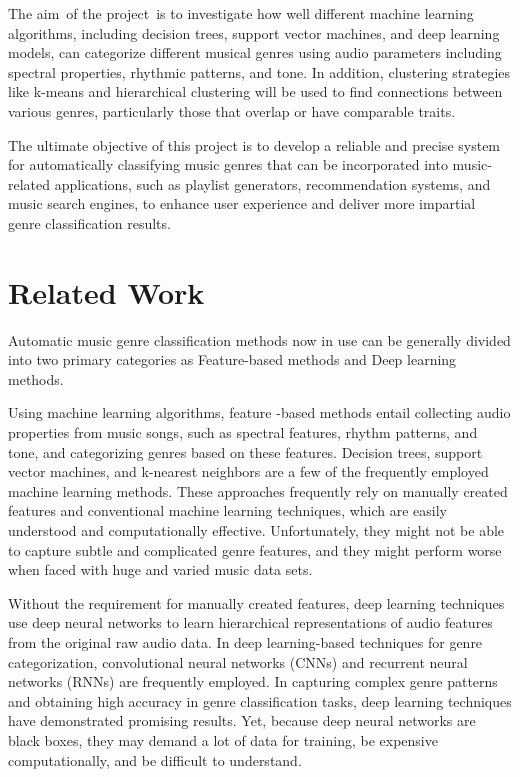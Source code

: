 \documentclass[conference]{IEEEtran}
\begin{document}
The aim of the project is to investigate how well different machine learning algorithms, including decision trees, support vector machines, and deep learning models, can categorize different musical genres using audio parameters including spectral properties, rhythmic patterns, and tone. In addition, clustering strategies like k-means and hierarchical clustering will be used to find connections between various genres, particularly those that overlap or have comparable traits.

The ultimate objective of this project is to develop a reliable and precise system for automatically classifying music genres that can be incorporated into music-related applications, such as playlist generators, recommendation systems, and music search engines, to enhance user experience and deliver more impartial genre classification results.

\section{Related Work}
Automatic music genre classification methods now in use can be generally divided into two primary categories as Feature-based methods and Deep learning methods.

Using machine learning algorithms, feature -based methods entail collecting audio properties from music songs, such as spectral features, rhythm patterns, and tone, and categorizing genres based on these features. Decision trees, support vector machines, and k-nearest neighbors are a few of the frequently employed machine learning methods. These approaches frequently rely on manually created features and conventional machine learning techniques, which are easily understood and computationally effective. Unfortunately, they might not be able to capture subtle and complicated genre features, and they might perform worse when faced with huge and varied music data sets.

Without the requirement for manually created features, deep learning techniques use deep neural networks to learn hierarchical representations of audio features from the original raw audio data. In deep learning-based techniques for genre categorization, convolutional neural networks (CNNs) and recurrent neural networks (RNNs) are frequently employed. In capturing complex genre patterns and obtaining high accuracy in genre classification tasks, deep learning techniques have demonstrated promising results. Yet, because deep neural networks are black boxes, they may demand a lot of data for training, be expensive computationally, and be difficult to understand.
\end{document}
